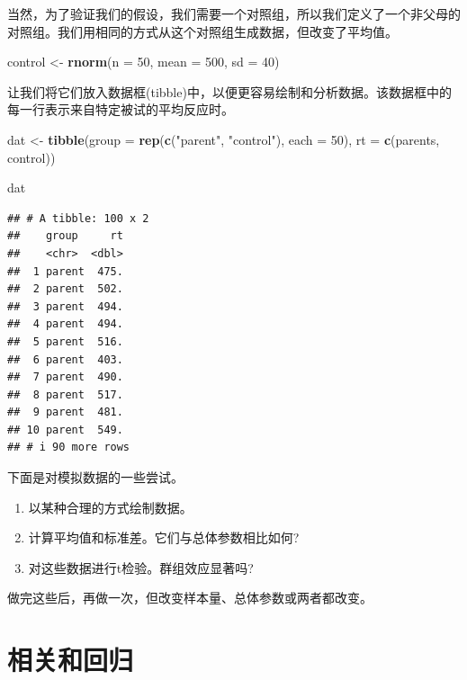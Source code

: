 \documentclass[
]{book}
\newenvironment{Shaded}{\begin{snugshade}}{\end{snugshade}}
\newcommand{\AttributeTok}[1]{\textcolor[rgb]{0.13,0.29,0.53}{#1}}
\newcommand{\DecValTok}[1]{\textcolor[rgb]{0.00,0.00,0.81}{#1}}
\newcommand{\FunctionTok}[1]{\textcolor[rgb]{0.13,0.29,0.53}{\textbf{#1}}}
\newcommand{\NormalTok}[1]{#1}
\newcommand{\OtherTok}[1]{\textcolor[rgb]{0.56,0.35,0.01}{#1}}
\newcommand{\StringTok}[1]{\textcolor[rgb]{0.31,0.60,0.02}{#1}}
\providecommand{\tightlist}{%
  \setlength{\itemsep}{0pt}\setlength{\parskip}{0pt}}
\begin{document}
当然，为了验证我们的假设，我们需要一个对照组，所以我们定义了一个非父母的对照组。我们用相同的方式从这个对照组生成数据，但改变了平均值。

\begin{Shaded}
\begin{Highlighting}[]
\NormalTok{control }\OtherTok{\textless{}{-}} \FunctionTok{rnorm}\NormalTok{(}\AttributeTok{n =} \DecValTok{50}\NormalTok{, }\AttributeTok{mean =} \DecValTok{500}\NormalTok{, }\AttributeTok{sd =} \DecValTok{40}\NormalTok{)}
\end{Highlighting}
\end{Shaded}

让我们将它们放入数据框(tibble)中，以便更容易绘制和分析数据。该数据框中的每一行表示来自特定被试的平均反应时。

\begin{Shaded}
\begin{Highlighting}[]
\NormalTok{dat }\OtherTok{\textless{}{-}} \FunctionTok{tibble}\NormalTok{(}\AttributeTok{group =} \FunctionTok{rep}\NormalTok{(}\FunctionTok{c}\NormalTok{(}\StringTok{"parent"}\NormalTok{, }\StringTok{"control"}\NormalTok{), }\AttributeTok{each =} \DecValTok{50}\NormalTok{),}
              \AttributeTok{rt =} \FunctionTok{c}\NormalTok{(parents, control))}

\NormalTok{dat}
\end{Highlighting}
\end{Shaded}

\begin{verbatim}
## # A tibble: 100 x 2
##    group     rt
##    <chr>  <dbl>
##  1 parent  475.
##  2 parent  502.
##  3 parent  494.
##  4 parent  494.
##  5 parent  516.
##  6 parent  403.
##  7 parent  490.
##  8 parent  517.
##  9 parent  481.
## 10 parent  549.
## # i 90 more rows
\end{verbatim}

下面是对模拟数据的一些尝试。

\begin{enumerate}
\def\labelenumi{\arabic{enumi}.}
\tightlist
\item
  以某种合理的方式绘制数据。
\item
  计算平均值和标准差。它们与总体参数相比如何?
\item
  对这些数据进行t检验。群组效应显著吗?
\end{enumerate}

做完这些后，再做一次，但改变样本量、总体参数或两者都改变。

\hypertarget{ux76f8ux5173ux548cux56deux5f52}{%
\chapter{相关和回归}\label{ux76f8ux5173ux548cux56deux5f52}}
\end{document}
